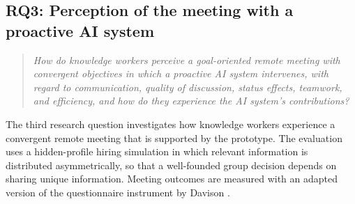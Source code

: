 \subsection{RQ3: Perception of the meeting with a proactive AI system}
\begin{quote}
  \textit{How do knowledge workers perceive a goal-oriented remote meeting with convergent objectives in
    which a proactive AI system intervenes, with regard to communication, quality of discussion, status
  effects, teamwork, and efficiency, and how do they experience the AI system's contributions?}
\end{quote}
The third research question investigates how knowledge workers experience a convergent remote
meeting that is supported by the prototype. The evaluation uses a hidden-profile hiring simulation
in which relevant information is distributed asymmetrically, so that a well-founded group decision
depends on sharing unique information. Meeting outcomes are measured with an adapted version of the questionnaire
instrument by Davison \cite{davisonInstrumentMeasuringMeeting1999}.

